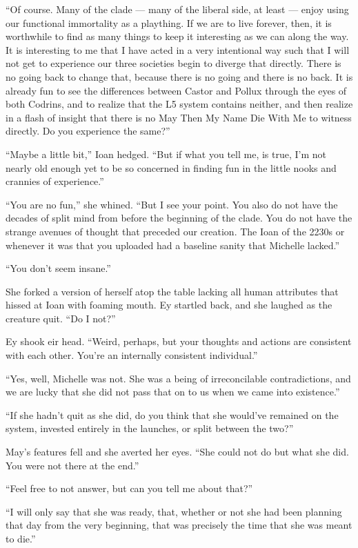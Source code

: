 ``Of course. Many of the clade — many of the liberal side, at least — enjoy using our functional immortality as a plaything. If we are to live forever, then, it is worthwhile to find as many things to keep it interesting as we can along the way. It is interesting to me that I have acted in a very intentional way such that I will not get to experience our three societies begin to diverge that directly. There is no going back to change that, because there is no going and there is no back. It is already fun to see the differences between Castor and Pollux through the eyes of both Codrins, and to realize that the L5 system contains neither, and then realize in a flash of insight that there is no May Then My Name Die With Me to witness directly. Do you experience the same?''

``Maybe a little bit,'' Ioan hedged. ``But if what you tell me, is true, I'm not nearly old enough yet to be so concerned in finding fun in the little nooks and crannies of experience.''

``You are no fun,'' she whined. ``But I see your point. You also do not have the decades of split mind from before the beginning of the clade. You do not have the strange avenues of thought that preceded our creation. The Ioan of the 2230s or whenever it was that you uploaded had a baseline sanity that Michelle lacked.''

``You don't seem insane.''

She forked a version of herself atop the table lacking all human attributes that hissed at Ioan with foaming mouth. Ey startled back, and she laughed as the creature quit. ``Do I not?''

Ey shook eir head. ``Weird, perhaps, but your thoughts and actions are consistent with each other. You're an internally consistent individual.''

``Yes, well, Michelle was not. She was a being of irreconcilable contradictions, and we are lucky that she did not pass that on to us when we came into existence.''

``If she hadn't quit as she did, do you think that she would've remained on the system, invested entirely in the launches, or split between the two?''

May's features fell and she averted her eyes. ``She could not do but what she did. You were not there at the end.''

``Feel free to not answer, but can you tell me about that?''

``I will only say that she was ready, that, whether or not she had been planning that day from the very beginning, that was precisely the time that she was meant to die.''

